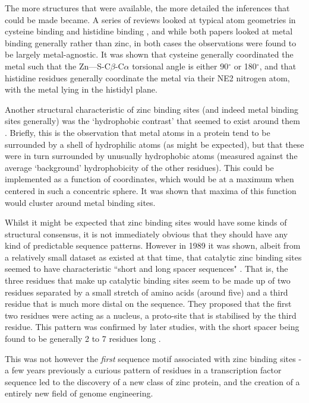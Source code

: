 The more structures that were available, the more detailed the inferences that could be made became. A series of reviews looked at typical atom geometries in cysteine binding \cite{chakrabarti1989geometry} and histidine binding \cite{chakrabarti1990geometry}, and while both papers looked at metal binding generally rather than zinc, in both cases the observations were found to be largely metal-agnostic. It was shown that cysteine generally coordinated the metal such that the Zn---S-C$\beta$-C$\alpha$ torsional angle is either 90$^\circ$ or 180$^\circ$, and that histidine residues generally coordinate the metal via their NE2 nitrogen atom, with the metal lying in the histidyl plane.

Another structural characteristic of zinc binding sites (and indeed metal binding sites generally) was the `hydrophobic contrast' that seemed to exist around them \cite{yamashita1990metal,gregory1993prediction}. Briefly, this is the observation that metal atoms in a protein tend to be surrounded by a shell of hydrophilic atoms (as might be expected), but that these were in turn surrounded by unusually hydrophobic atoms (measured against the average `background' hydrophobicity of the other residues). This could be implemented as a function of coordinates, which would be at a maximum when centered in such a concentric sphere. It was shown that maxima of this function would cluster around metal binding sites.

Whilst it might be expected that zinc binding sites would have some kinds of structural consensus, it is not immediately obvious that they should have any kind of predictable sequence patterns. However in 1989 it was shown, albeit from a relatively small dataset as existed at that time, that catalytic zinc binding sites seemed to have characteristic ``short and long spacer sequences" \cite{vallee1989short}. That is, the three residues that make up catalytic binding sites seem to be made up of two residues separated by a small stretch of amino acids (around five) and a third residue that is much more distal on the sequence. They proposed that the first two residues were acting as a nucleus, a proto-site that is stabilised by the third residue. This pattern was confirmed by later studies, with the short spacer being found to be generally 2 to 7 residues long \cite{patel2007analysis}.

This was not however the \textit{first} sequence motif associated with zinc binding sites - a few years previously a curious pattern of residues in a transcription factor sequence led to the discovery of a new class of zinc protein, and the creation of a entirely new field of genome engineering.

